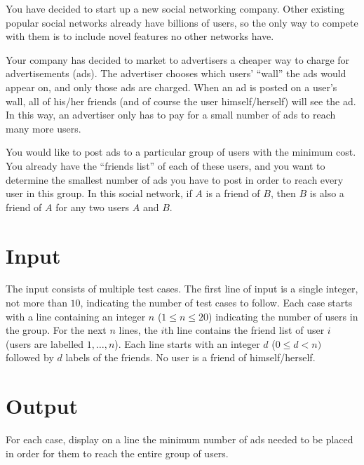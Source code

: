 

You have decided to start up a new social networking company.  Other
existing popular social networks already have billions of users, so
the only way to compete with them is to include novel features no
other networks have.

Your company has decided to market to advertisers a cheaper way to
charge for advertisements (ads).  The advertiser chooses which users'
``wall'' the ads would appear on, and only those ads are charged.
When an ad is posted on a user's wall, all of his/her friends (and of
course the user himself/herself) will see the ad.  In this way, an
advertiser only has to pay for a small number of ads to reach many
more users.

You would like to post ads to a particular group of users
with the minimum cost.  You already have the ``friends list'' of each
of these users, and you want to determine the smallest number of ads
you have to post in order to reach every user in this group.  In this
social network, if $A$ is a friend of $B$, then $B$ is also a friend
of $A$ for any two users $A$ and $B$.

\section*{Input}

The input consists of multiple test cases. The first line of input 
is a single integer, not more than $10$, indicating the number
of test cases to follow.  
Each case starts with a line containing an integer
$n$ ($1 \leq n \leq 20$) indicating the number of users in the group.
For the next $n$ lines, the $i$th line contains the friend list of
user $i$ (users are labelled $1, \ldots, n$).  Each line starts with
an integer $d$ ($0 \leq d < n)$ followed by $d$ labels of the friends.
No user is a friend of himself/herself.


\section*{Output}

For each case, display on a line the minimum number of ads needed to be
placed in order for them to reach the entire group of users.
